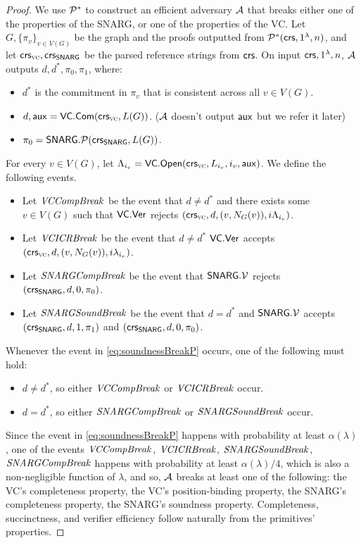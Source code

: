 \begin{proof}
    We use $\mathcal{P}^*$ to construct an efficient adversary $\mathcal{A}$ that breaks either one of the properties of the SNARG, or one of the properties of the VC. Let $G, \{\pi_{v}\}_{v\in V(G)}$ be the graph and the proofs outputted from $\mathcal{P}^*(\mathsf{crs}, 1^\lambda ,n)$, and let $\mathsf{crs}_\textsc{vc}, \mathsf{crs}_{\mathsf{SNARG}}$ be the parsed reference strings from $\mathsf{crs}$.
    On input $\mathsf{crs}, 1^\lambda, n$, $\mathcal{A}$ outputs $d, d^*, \pi_0, \pi_1$, where:
    \begin{itemize}
        \item $d^*$ is the commitment in $\pi_v$ that is consistent across all $v\in V(G)$.
        \item $d, \mathsf{aux} = \mathsf{VC}.\mathsf{Com}(\mathsf{crs}_\textsc{vc}, L(G))$. ($\mathcal{A}$ doesn't output $\mathsf{aux}$ but we refer it later)
        \item $\pi_0 = \mathsf{SNARG}.\mathcal{P}(\mathsf{crs}_{\mathsf{SNARG}}, L(G))$.
    \end{itemize}
    For every $v\in V(G)$, let $\Lambda_{i_v} = \mathsf{VC}.\mathsf{Open}(\mathsf{crs}_\textsc{vc}, L_{i_v}, i_v, \mathsf{aux})$.
    We define the following events.
    \begin{itemize}
        \item Let $\mathit{ VCCompBreak }$ be the event that $d\neq d^*$ and there exists some $v\in V(G)$ such that $\mathsf{VC}.\mathsf{Ver}$ rejects $(\mathsf{crs}_\textsc{vc}, d, (v,N_G(v)), i \Lambda_{i_v})$.
        \item Let $\mathit{ VCICRBreak }$ be the event that $d\neq d^*$ $\mathsf{VC}.\mathsf{Ver}$ accepts $(\mathsf{crs}_\textsc{vc}, d, (v,N_G(v)), i \lambda_{i_v})$.
        \item Let $\mathit{ SNARGCompBreak }$ be the event that $\mathsf{SNARG}.\mathcal{V}$ rejects $(\mathsf{crs}_{\mathsf{SNARG}}, d, 0, \pi_0)$.
        \item Let $\mathit{ SNARGSoundBreak }$ be the event that $d = d^*$ and $\mathsf{SNARG}.\mathcal{V}$ accepts $(\mathsf{crs}_{\mathsf{SNARG}}, d, 1, \pi_1)$ and $(\mathsf{crs}_{\mathsf{SNARG}}, d, 0, \pi_0)$.
    \end{itemize}
    Whenever the event in \ref{eq:soundnessBreakP} occurs, one of the following must hold:
    \begin{itemize}
        \item $d \neq d^*$, so either $\mathit{ VCCompBreak }$ or $\mathit{ VCICRBreak }$ occur.
        \item $d = d^*$, so either $\mathit{ SNARGCompBreak }$ or $\mathit{ SNARGSoundBreak }$ occur.
    \end{itemize}
    Since the event in \ref{eq:soundnessBreakP} happens with probability at least $\alpha(\lambda)$, one of the events $\mathit{ VCCompBreak }$, $\mathit{ VCICRBreak }$, $\mathit{ SNARGSoundBreak }$, $\mathit{ SNARGCompBreak }$ happens with probability at least $\alpha(\lambda)/4$, which is also a non-negligible function of $\lambda$, and so, $\mathcal{A}$ breaks at least one of the following: the VC's completeness property, the VC's position-binding property, the SNARG's completeness property, the SNARG's soundness property.
Completeness, succinctness, and verifier efficiency follow naturally from the primitives' properties.
\end{proof}


